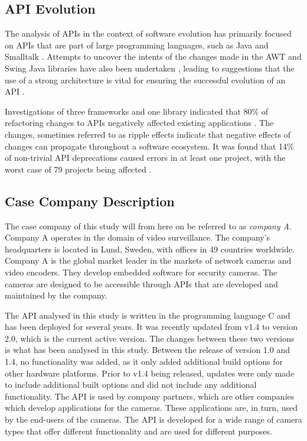 \documentclass{sig-alternate}
\begin{document}
\subsection{API Evolution} \label{related_work}
The analysis of APIs in the context of software evolution has primarily focused on APIs that are part of large programming languages, such as Java \cite{hou2011exploring, shi2011empirical} and Smalltalk \cite{robbes2012developers}. Attempts to uncover the intents of the changes made in the AWT and Swing Java libraries have also been undertaken \cite{hou2011exploring}, leading to suggestions that the use of a strong architecture is vital for ensuring the successful evolution of an API \cite{hou2011exploring}.

Investigations of three frameworks and one library indicated that 80\% of refactoring changes to APIs negatively affected existing applications \cite{dig2005role}. The changes, sometimes referred to as ripple effects \cite{robbes2012developers} indicate that negative effects of changes can propagate throughout a software ecosystem. It was found that 14\% of non-trivial API deprecations caused errors in at least one project, with the worst case of 79 projects being affected \cite{robbes2012developers}.




\subsection{Case Company Description} \label{case_company_description}
The case company of this study will from here on be referred to as \textit{company A}. Company A operates in the domain of video surveillance. The company's headquarters is located in Lund, Sweden, with offices in 49 countries worldwide. Company A is the global market leader in the markets of network cameras and video encoders. They develop embedded software for security cameras. The cameras are designed to be accessible through APIs that are developed and maintained by the company. 

The API analysed in this study is written in the programming language C and has been deployed for several years. It was recently updated from v1.4 to version 2.0, which is the current active version. The changes between these two versions is what has been analysed in this study. Between the release of version 1.0 and 1.4, no functionality was added, as it only added additional build options for other hardware platforms. Prior to v1.4 being released, updates were only made to include additional built options and did not include any additional functionality. The API is used by company partners, which are other companies which develop applications for the cameras. These applications are, in turn, used by the end-users of the cameras. The API is developed for a wide range of camera types that offer different functionality and are used for different purposes. 
\end{document}
